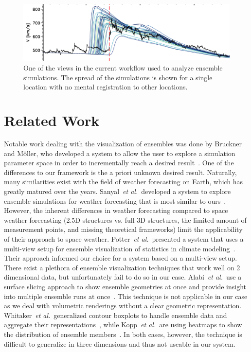 \documentclass[journal]{vgtc}                %
\def\etal{\textit{et al.}}
\def\etal{\textit{et al.}}
\begin{document}
\begin{figure}
\newcommand{\abImageWidth}{\columnwidth}
\centering
\includegraphics[width=\abImageWidth]{figures/current_workflow_ensemble.png}
\caption{One of the views in the current workflow used to analyze ensemble simulations. The spread of the simulations is shown for a single location with no mental registration to other locations.}
\label{fig:currentworkflow:ensemble}
\end{figure}

\section{Related Work}
 Notable work dealing with the visualization of ensembles was done by Bruckner and M\"oller, who developed a system to allow the user to explore a simulation parameter space in order to incrementally reach a desired result~\cite{bruckner2010result}. One of the differences to our framework is the a priori unknown desired result. Naturally, many similarities exist with the field of weather forecasting on Earth, which has greatly matured over the years. Sanyal~\etal\ developed a system to explore ensemble simulations for weather forecasting that is most similar to ours~\cite{sanyal2010noodles}. However, the inherent differences in weather forecasting compared to space weather forecasting (2.5D structures vs. full 3D structures, the limited amount of measurement points, and missing theoretical frameworks) limit the applicability of their approach to space weather. Potter~\etal\ presented a system that uses a multi-view setup for ensemble visualization of statistics in climate modeling~\cite{potter2009ensemble}. Their approach informed our choice for a system based on a multi-view setup. There exist a plethora of ensemble visualization techniques that work well on 2 dimensional data, but unfortunately fail to do so in our case. Alabi~\etal\ use a surface slicing approach to show ensemble geometries at once and provide insight into multiple ensemble runs at once~\cite{alabi2012comparative}. This technique is not applicable in our case as we deal with volumetric renderings without a clear geometric representation. Whitaker~\etal\ generalized contour boxplots to handle ensemble data and aggregate their representations~\cite{whitaker2013contour}, while Kopp~\etal\ are using heatmaps to show the distribution of ensemble members~\cite{kopp2014decision}. In both cases, however, the technique is difficult to generalize in three dimensions and thus not useable in our system.
\end{document}
